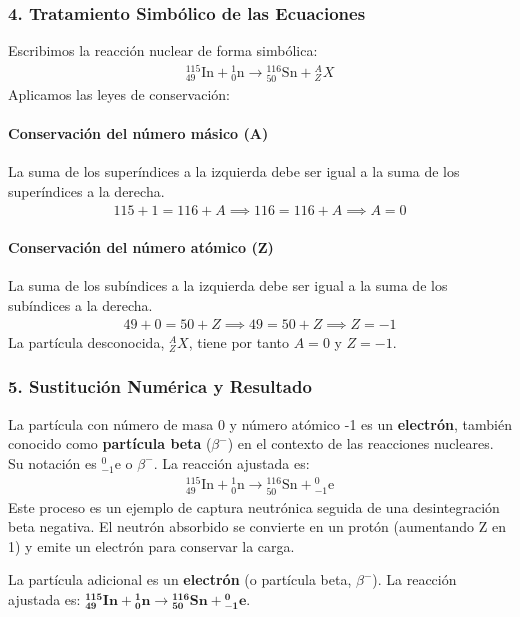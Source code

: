 \subsubsection*{4. Tratamiento Simbólico de las Ecuaciones}
Escribimos la reacción nuclear de forma simbólica:
\begin{gather}
    {}_{49}^{115}\text{In} + {}_{0}^{1}\text{n} \longrightarrow {}_{50}^{116}\text{Sn} + {}_{Z}^{A}X
\end{gather}
Aplicamos las leyes de conservación:
\paragraph{Conservación del número másico (A)}
La suma de los superíndices a la izquierda debe ser igual a la suma de los superíndices a la derecha.
\begin{gather}
    115 + 1 = 116 + A \implies 116 = 116 + A \implies A = 0
\end{gather}
\paragraph{Conservación del número atómico (Z)}
La suma de los subíndices a la izquierda debe ser igual a la suma de los subíndices a la derecha.
\begin{gather}
    49 + 0 = 50 + Z \implies 49 = 50 + Z \implies Z = -1
\end{gather}
La partícula desconocida, ${}_{Z}^{A}X$, tiene por tanto $A=0$ y $Z=-1$.

\subsubsection*{5. Sustitución Numérica y Resultado}
La partícula con número de masa 0 y número atómico -1 es un \textbf{electrón}, también conocido como \textbf{partícula beta} ($\beta^-$) en el contexto de las reacciones nucleares. Su notación es ${}_{-1}^{0}\text{e}$ o $\beta^-$.
La reacción ajustada es:
\begin{gather}
    {}_{49}^{115}\text{In} + {}_{0}^{1}\text{n} \longrightarrow {}_{50}^{116}\text{Sn} + {}_{-1}^{0}\text{e}
\end{gather}
Este proceso es un ejemplo de captura neutrónica seguida de una desintegración beta negativa. El neutrón absorbido se convierte en un protón (aumentando Z en 1) y emite un electrón para conservar la carga.
\begin{cajaresultado}
La partícula adicional es un \textbf{electrón} (o partícula beta, $\beta^-$).
La reacción ajustada es: $\boldsymbol{{}_{49}^{115}\text{In} + {}_{0}^{1}\text{n} \longrightarrow {}_{50}^{116}\text{Sn} + {}_{-1}^{0}\text{e}}$.
\end{cajaresultado}

